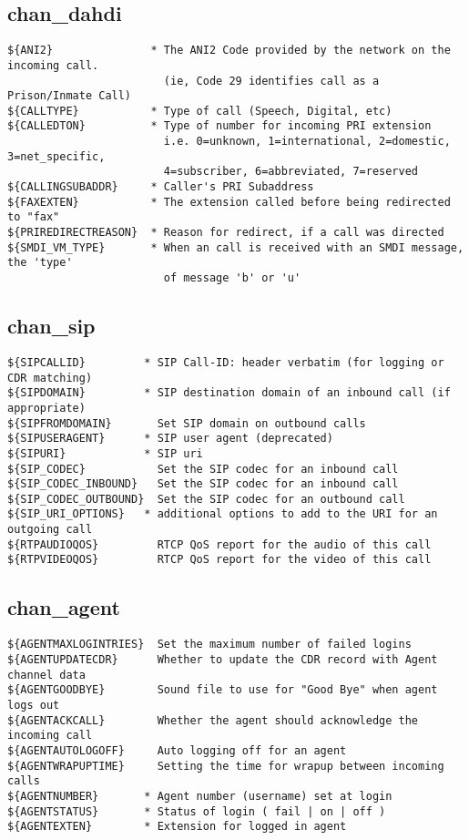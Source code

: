 \subsection{chan\_dahdi}
\begin{verbatim}
${ANI2}               * The ANI2 Code provided by the network on the incoming call.
                        (ie, Code 29 identifies call as a Prison/Inmate Call)
${CALLTYPE}           * Type of call (Speech, Digital, etc)
${CALLEDTON}          * Type of number for incoming PRI extension
                        i.e. 0=unknown, 1=international, 2=domestic, 3=net_specific,
                        4=subscriber, 6=abbreviated, 7=reserved
${CALLINGSUBADDR}     * Caller's PRI Subaddress
${FAXEXTEN}           * The extension called before being redirected to "fax"
${PRIREDIRECTREASON}  * Reason for redirect, if a call was directed
${SMDI_VM_TYPE}       * When an call is received with an SMDI message, the 'type'
                        of message 'b' or 'u'
\end{verbatim}

\subsection{chan\_sip}
\begin{verbatim}
${SIPCALLID}         * SIP Call-ID: header verbatim (for logging or CDR matching)
${SIPDOMAIN}         * SIP destination domain of an inbound call (if appropriate)
${SIPFROMDOMAIN}       Set SIP domain on outbound calls
${SIPUSERAGENT}      * SIP user agent (deprecated)
${SIPURI}            * SIP uri
${SIP_CODEC}           Set the SIP codec for an inbound call
${SIP_CODEC_INBOUND}   Set the SIP codec for an inbound call
${SIP_CODEC_OUTBOUND}  Set the SIP codec for an outbound call
${SIP_URI_OPTIONS}   * additional options to add to the URI for an outgoing call
${RTPAUDIOQOS}         RTCP QoS report for the audio of this call
${RTPVIDEOQOS}         RTCP QoS report for the video of this call
\end{verbatim}

\subsection{chan\_agent}
\begin{verbatim}
${AGENTMAXLOGINTRIES}  Set the maximum number of failed logins
${AGENTUPDATECDR}      Whether to update the CDR record with Agent channel data
${AGENTGOODBYE}        Sound file to use for "Good Bye" when agent logs out
${AGENTACKCALL}        Whether the agent should acknowledge the incoming call
${AGENTAUTOLOGOFF}     Auto logging off for an agent
${AGENTWRAPUPTIME}     Setting the time for wrapup between incoming calls
${AGENTNUMBER}       * Agent number (username) set at login
${AGENTSTATUS}       * Status of login ( fail | on | off )
${AGENTEXTEN}        * Extension for logged in agent
\end{verbatim}


